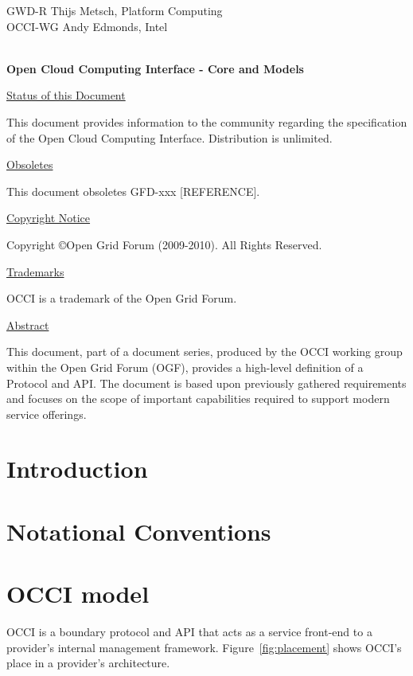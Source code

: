 \documentclass[10pt,a4paper,british]{article}
\begin{document}
\thispagestyle{empty}

GWD-R \hfill  Thijs Metsch, Platform Computing\\
OCCI-WG \hfill  Andy Edmonds, Intel\\
\\

\vspace*{0.5in}

\begin{Large}
\textbf{Open Cloud Computing Interface - Core and Models}
\end{Large}

\vspace*{0.5in}

\underline{Status of this Document}

This document provides information to the community regarding the
specification of the Open Cloud Computing Interface. Distribution is
unlimited.

\underline{Obsoletes}

This document obsoletes GFD-xxx [REFERENCE].

\underline{Copyright Notice}

Copyright \copyright Open Grid Forum (2009-2010). All Rights Reserved.

\underline{Trademarks}

OCCI is a trademark of the Open Grid Forum.

\underline{Abstract}

This document, part of a document series, produced by the OCCI working
group within the Open Grid Forum (OGF), provides a high-level
definition of a Protocol and API. The document is based upon
previously gathered requirements and focuses on the scope of important
capabilities required to support modern service offerings.

\newpage
\tableofcontents
\newpage

\section{Introduction}


\section{Notational Conventions}


\section{OCCI model}
OCCI is a boundary protocol and API
that acts as a service front-end to a provider's internal management
framework. Figure~\ref{fig:placement} shows OCCI's place in a
provider's architecture.
\end{document}
